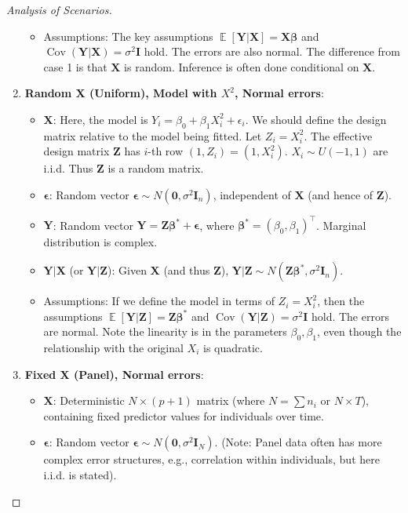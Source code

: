 \documentclass[11pt, a4paper]{article}
\DeclareMathOperator{\E}{\mathbb{E}}             %
\DeclareMathOperator{\Cov}{\mathrm{Cov}}         %
\theoremstyle{definition}
\theoremstyle{remark}
\newcommand{\mat}[1]{\mathbf{#1}}       %
\newcommand{\vect}[1]{\bm{#1}}          %
\newcommand{\transpose}{^{\top}}        %
\begin{document}
\begin{proof}[Analysis of Scenarios]
\begin{enumerate}
\begin{itemize}
            \item Assumptions: The key assumptions $\E[\vect{Y}|\mat{X}] = \mat{X}\vect{\beta}$ and $\Cov(\vect{Y}|\mat{X}) = \sigma^2 \mat{I}$ hold. The errors are also normal. The difference from case 1 is that $\mat{X}$ is random. Inference is often done conditional on $\mat{X}$.
        \end{itemize}
    \item \textbf{Random X (Uniform), Model with $X^2$, Normal errors}:
        \begin{itemize}
            \item $\mat{X}$: Here, the model is $Y_i = \beta_0 + \beta_1 X_i^2 + \epsilon_i$. We should define the design matrix relative to the model being fitted. Let $Z_i = X_i^2$. The effective design matrix $\mat{Z}$ has $i$-th row $(1, Z_i) = (1, X_i^2)$. $X_i \sim U(-1, 1)$ are i.i.d. Thus $\mat{Z}$ is a random matrix.
            \item $\vect{\epsilon}$: Random vector $\vect{\epsilon} \sim N(\vect{0}, \sigma^2 \mat{I}_n)$, independent of $\mat{X}$ (and hence of $\mat{Z}$).
            \item $\vect{Y}$: Random vector $\vect{Y} = \mat{Z}\vect{\beta}^* + \vect{\epsilon}$, where $\vect{\beta}^* = (\beta_0, \beta_1)\transpose$. Marginal distribution is complex.
            \item $\vect{Y}|\mat{X}$ (or $\vect{Y}|\mat{Z}$): Given $\mat{X}$ (and thus $\mat{Z}$), $\vect{Y}|\mat{Z} \sim N(\mat{Z}\vect{\beta}^*, \sigma^2 \mat{I}_n)$.
            \item Assumptions: If we define the model in terms of $Z_i=X_i^2$, then the assumptions $\E[\vect{Y}|\mat{Z}] = \mat{Z}\vect{\beta}^*$ and $\Cov(\vect{Y}|\mat{Z}) = \sigma^2 \mat{I}$ hold. The errors are normal. Note the linearity is in the parameters $\beta_0, \beta_1$, even though the relationship with the original $X_i$ is quadratic.
        \end{itemize}
    \item \textbf{Fixed X (Panel), Normal errors}:
        \begin{itemize}
            \item $\mat{X}$: Deterministic $N \times (p+1)$ matrix (where $N = \sum n_i$ or $N \times T$), containing fixed predictor values for individuals over time.
            \item $\vect{\epsilon}$: Random vector $\vect{\epsilon} \sim N(\vect{0}, \sigma^2 \mat{I}_N)$. (Note: Panel data often has more complex error structures, e.g., correlation within individuals, but here i.i.d. is stated).

\end{itemize}
\end{enumerate}
\end{proof}
\end{document}
